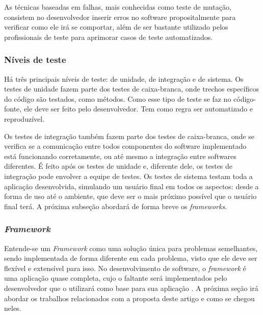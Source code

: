 \documentclass[twoside,english,brazilian]{UNISINOSartigo}
\begin{document}
As técnicas baseadas em falhas, mais conhecidas como teste de mutação, consistem no desenvolvedor inserir erros no software propositalmente para verificar como ele irá se comportar, além de ser bastante utilizado pelos profissionais de teste para aprimorar casos de teste automatizados.%


\subsubsection{Níveis de teste}
Há três principais níveis de teste: de unidade, de integração e de sistema. Os testes de unidade fazem parte dos testes de caixa-branca, onde trechos específicos do código são testados, como métodos. Como esse tipo de teste se faz no código-fonte, ele deve ser feito pelo desenvolvedor. Tem como regra ser automatizado e reproduzível.

Os testes de integração também fazem parte dos testes de caixa-branca, onde se verifica se a comunicação entre todos componentes do software implementado está funcionando corretamente, ou até mesmo a integração entre softwares diferentes. É feito após os testes de unidade e, diferente dele, os testes de integração pode envolver a equipe de testes. Os testes de sistema testam toda a aplicação desenvolvida, simulando um usuário final em todos os aspectos: desde a forma de uso até o ambiente, que deve ser o mais próximo possível que o usuário final terá. A próxima subseção abordará de forma breve os \textit{frameworks}.


\subsubsection{\textit{Framework}}

Entende-se um \textit{Framework} como uma solução única para problemas semelhantes, sendo implementada de forma diferente em cada problema, visto que ele deve ser flexível e extensível para isso. No desenvolvimento de software, o \textit{framework} é uma aplicação quase completa, cujo o faltante será implementados pelo desenvolvedor que o utilizará como base para sua aplicação \cite{ufcg}. A próxima seção irá abordar os trabalhos relacionados com a proposta deste artigo e como se chegou neles.
\end{document}
